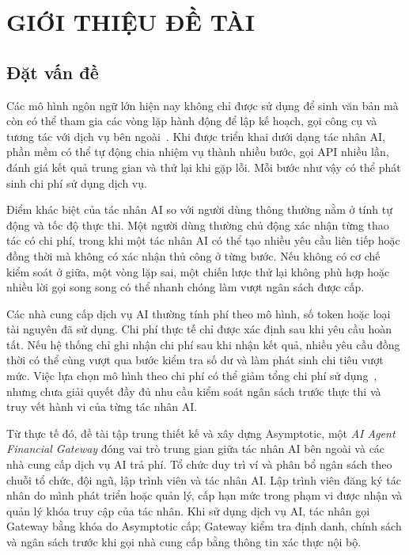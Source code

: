 \chapter{GIỚI THIỆU ĐỀ TÀI}

\section{Đặt vấn đề}

Các mô hình ngôn ngữ lớn hiện nay không chỉ được sử dụng để sinh văn bản mà còn có thể tham gia các vòng lặp hành động để lập kế hoạch, gọi công cụ và tương tác với dịch vụ bên ngoài~\cite{Yao2022ReAct,Schick2023Toolformer}. Khi được triển khai dưới dạng tác nhân AI, phần mềm có thể tự động chia nhiệm vụ thành nhiều bước, gọi API nhiều lần, đánh giá kết quả trung gian và thử lại khi gặp lỗi. Mỗi bước như vậy có thể phát sinh chi phí sử dụng dịch vụ.

Điểm khác biệt của tác nhân AI so với người dùng thông thường nằm ở tính tự động và tốc độ thực thi. Một người dùng thường chủ động xác nhận từng thao tác có chi phí, trong khi một tác nhân AI có thể tạo nhiều yêu cầu liên tiếp hoặc đồng thời mà không có xác nhận thủ công ở từng bước. Nếu không có cơ chế kiểm soát ở giữa, một vòng lặp sai, một chiến lược thử lại không phù hợp hoặc nhiều lời gọi song song có thể nhanh chóng làm vượt ngân sách được cấp.

Các nhà cung cấp dịch vụ AI thường tính phí theo mô hình, số token hoặc loại tài nguyên đã sử dụng. Chi phí thực tế chỉ được xác định sau khi yêu cầu hoàn tất. Nếu hệ thống chỉ ghi nhận chi phí sau khi nhận kết quả, nhiều yêu cầu đồng thời có thể cùng vượt qua bước kiểm tra số dư và làm phát sinh chi tiêu vượt mức. Việc lựa chọn mô hình theo chi phí có thể giảm tổng chi phí sử dụng~\cite{Chen2023FrugalGPT}, nhưng chưa giải quyết đầy đủ nhu cầu kiểm soát ngân sách trước thực thi và truy vết hành vi của từng tác nhân AI.

Từ thực tế đó, đề tài tập trung thiết kế và xây dựng Asymptotic, một \textit{AI Agent Financial Gateway} đóng vai trò trung gian giữa tác nhân AI bên ngoài và các nhà cung cấp dịch vụ AI trả phí. Tổ chức duy trì ví và phân bổ ngân sách theo chuỗi tổ chức, đội ngũ, lập trình viên và tác nhân AI. Lập trình viên đăng ký tác nhân do mình phát triển hoặc quản lý, cấp hạn mức trong phạm vi được nhận và quản lý khóa truy cập của tác nhân. Khi sử dụng dịch vụ AI, tác nhân gọi Gateway bằng khóa do Asymptotic cấp; Gateway kiểm tra định danh, chính sách và ngân sách trước khi gọi nhà cung cấp bằng thông tin xác thực nội bộ.

